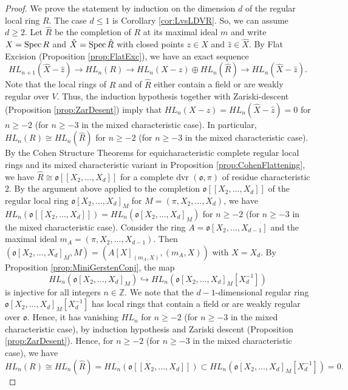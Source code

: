 \documentclass[10pt,a4paper]{amsart}
\newcommand{\Z}{\mathbb{Z}}
\newcommand{\ooo}{\mathfrak{o}}
\newcommand{\spec}{\mathrm{Spec\hskip .5mm }}
\begin{document}
\begin{proof}
We prove the statement by induction on the dimension $d$ of the regular local ring $R$.
The case $d\leq 1$ is Corollary \ref{cor:LvsLDVR}.
So, we can assume $d\geq 2$.
Let $\hat{R}$ be the completion of $R$ at its maximal ideal $m$ and write $X=\spec R$ and $\hat{X}=\spec \hat{R}$ with closed points $z\in X$ and $\hat{z} \in \hat{X}$.
By Flat Excision (Proposition \ref{prop:FlatExc}), we have an exact sequence
$$HL_{n+1}(\hat{X}-\hat{z})  \to HL_n(R) \to HL_n(X-z) \oplus HL_n(\hat{R}) \to HL_{n}(\hat{X}-\hat{z}).$$
Note that the local rings of $R$ and of $\hat{R}$ either contain a field or are weakly regular over $V$.
Thus, the induction hypothesis together with Zariski-descent (Proposition \ref{prop:ZarDesent}) imply that $HL_n(X-z) = HL_{n}(\hat{X}-\hat{z})=0$ for $n\geq -2$ (for $n\geq -3$ in the mixed characteristic case).
In particular, $HL_n(R) \cong HL_n(\hat{R})$ for $n \geq -2$ (for $n\geq -3$ in the mixed characteristic case).
By the Cohen Structure Theorems for equicharacteristic complete regular local rings and its mixed characteristic variant in Proposition \ref{prop:CohenFlattening}, we have $\hat{R}\cong \ooo[[X_2,...,X_d]]$ for a complete dvr $(\ooo,\pi)$ of residue characteristic $2$.
By the argument above applied to the completion $\ooo[[X_2,...,X_d]]$ of the regular local ring $\ooo[X_2,...,X_d]_M$ for $M=(\pi,X_2,...,X_d)$, 
we have $HL_n(\ooo[[X_2,...,X_d]]) = HL_n(\ooo[X_2,...,X_d]_M)$ for $n\geq -2$ (for $n\geq -3$ in the mixed characteristic case).
Consider the ring $A=\ooo[X_2,...,X_{d-1}]$ and the maximal ideal $m_A=(\pi,X_2,...,X_{d-1})$.
Then $(\ooo[X_2,...,X_d]_M,M) = (A[X]_{(m_A,X)},(m_A,X))$ with $X=X_d$.
By Proposition \ref{prop:MiniGerstenConj}, the map 
$$HL_n(\ooo[X_2,...,X_d]_M) \hookrightarrow HL_n(\ooo[X_2,...,X_d]_M[X_d^{-1}])$$ is injective for all integers $n\in \Z$.
We note that the $d-1$-dimensional regular ring $\ooo[X_2,...,X_d]_M[X_d^{-1}]$ has local rings that contain a field or are weakly regular over $\ooo$.
Hence, it has vanishing $HL_n$ for $n\geq -2$ (for $n\geq -3$ in the mixed characteristic case), by induction hypothesis and Zariski descent (Proposition \ref{prop:ZarDesent}).
Hence, for $n\geq -2$ (for $n\geq -3$ in the mixed characteristic case), we have
$$HL_n(R) \cong HL_n(\hat{R})= HL_n(\ooo[[X_2,...,X_d]]) \subset  HL_n(\ooo[X_2,...,X_d]_M[X_d^{-1}])=0.$$
\end{proof}
\end{document}
